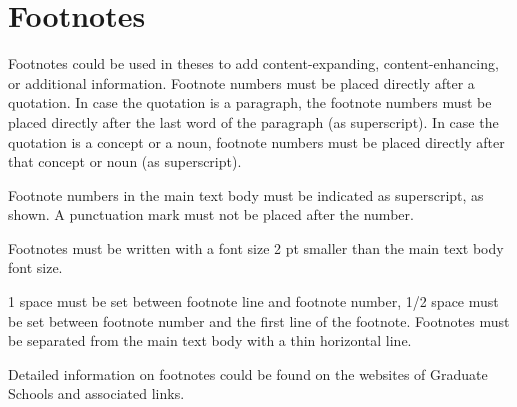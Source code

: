 \section{Footnotes}

Footnotes could be used in theses to add content-expanding, content-enhancing, or additional information. 
Footnote numbers must be placed directly after a quotation. In case the quotation is a paragraph, the footnote numbers must be placed directly after the last word of the paragraph (as superscript). In case the quotation is a concept or a noun, footnote numbers must be placed directly after that concept or noun (as superscript). 

Footnote numbers in the main text body must be indicated as superscript, as shown\footnotemark. A punctuation mark must not be placed after the number.

Footnotes must be written with a font size 2 pt smaller than the main text body font size.
 
1 space must be set between footnote line and footnote number, 1/2 space must be set between footnote number and the first line of the footnote. Footnotes must be separated from the main text body with a thin horizontal line. 

Detailed information on footnotes could be found on the websites of Graduate Schools and associated links.


